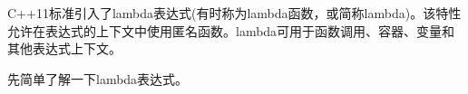 C++11标准引入了lambda表达式(有时称为lambda函数，或简称lambda)。该特性允许在表达式的上下文中使用匿名函数。lambda可用于函数调用、容器、变量和其他表达式上下文。

先简单了解一下lambda表达式。